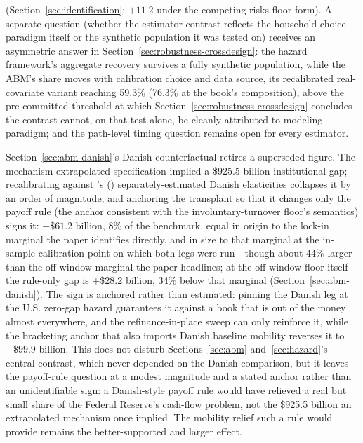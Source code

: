 \documentclass[12pt]{article}
\newcommand{\citepos}[1]{\citeauthor{#1}'s (\citeyear{#1})}
\begin{document}
(Section~\ref{sec:identification}; $+11.2$ under the competing-risks floor form). A separate question (whether the estimator contrast reflects the household-choice paradigm itself or the synthetic population it was tested on) receives an asymmetric answer in Section~\ref{sec:robustness-crossdesign}: the hazard framework's aggregate recovery survives a fully synthetic population, while the ABM's share moves with calibration choice and data source, its recalibrated real-covariate variant reaching 59.3\% (76.3\% at the book's composition), above the pre-committed threshold at which Section~\ref{sec:robustness-crossdesign} concludes the contrast cannot, on that test alone, be cleanly attributed to modeling paradigm; and the path-level timing question remains open for every estimator.

Section~\ref{sec:abm-danish}'s Danish counterfactual retires a superseded figure. The mechanism-extrapolated specification implied a \$925.5 billion institutional gap; recalibrating against \citepos{berger2026} separately-estimated Danish elasticities collapses it by an order of magnitude, and anchoring the transplant so that it changes only the payoff rule (the anchor consistent with the involuntary-turnover floor's semantics) signs it: $+\$61.2$ billion, 8\% of the benchmark, equal in origin to the lock-in marginal the paper identifies directly, and in size to that marginal at the in-sample calibration point on which both legs were run---though about 44\% larger than the off-window marginal the paper headlines; at the off-window floor itself the rule-only gap is $+\$28.2$ billion, 34\% below that marginal (Section~\ref{sec:abm-danish}). The sign is anchored rather than estimated: pinning the Danish leg at the U.S. zero-gap hazard guarantees it against a book that is out of the money almost everywhere, and the refinance-in-place sweep can only reinforce it, while the bracketing anchor that also imports Danish baseline mobility reverses it to $-\$99.9$ billion. This does not disturb Sections~\ref{sec:abm} and~\ref{sec:hazard}'s central contrast, which never depended on the Danish comparison, but it leaves the payoff-rule question at a modest magnitude and a stated anchor rather than an unidentifiable sign: a Danish-style payoff rule would have relieved a real but small share of the Federal Reserve's cash-flow problem, not the \$925.5 billion an extrapolated mechanism once implied. The mobility relief such a rule would provide remains the better-supported and larger effect.
\end{document}
